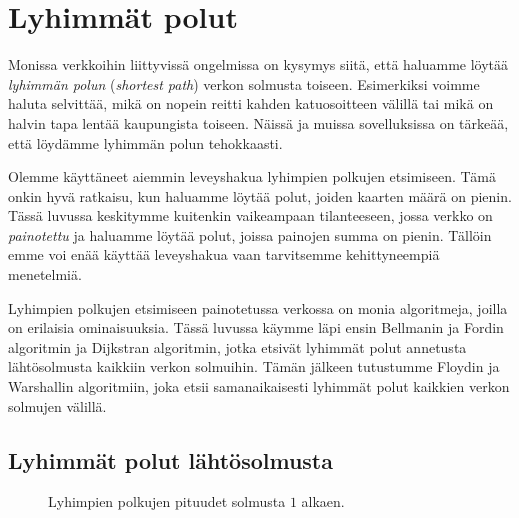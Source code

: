 \chapter{Lyhimmät polut}


Monissa verkkoihin liittyvissä ongelmissa on kysymys siitä,
että haluamme löytää \emph{lyhimmän polun} (\emph{shortest path})
verkon solmusta toiseen.
Esimerkiksi voimme haluta selvittää,
mikä on nopein reitti kahden katuosoitteen välillä
tai mikä on halvin tapa lentää kaupungista toiseen.
Näissä ja muissa sovelluksissa on tärkeää,
että löydämme lyhimmän polun tehokkaasti.

Olemme käyttäneet aiemmin leveyshakua lyhimpien
polkujen etsimiseen.
Tämä onkin hyvä ratkaisu, kun haluamme löytää polut,
joiden kaarten määrä on pienin.
Tässä luvussa keskitymme kuitenkin vaikeampaan
tilanteeseen, jossa verkko on \emph{painotettu}
ja haluamme löytää polut,
joissa painojen summa on pienin.
Tällöin emme voi enää käyttää leveyshakua vaan
tarvitsemme kehittyneempiä menetelmiä.

Lyhimpien polkujen etsimiseen painotetussa verkossa
on monia algoritmeja, joilla on erilaisia ominaisuuksia.
Tässä luvussa käymme läpi ensin Bellmanin ja Fordin algoritmin ja
Dijkstran algoritmin,
jotka etsivät lyhimmät polut annetusta lähtösolmusta
kaikkiin verkon solmuihin.
Tämän jälkeen tutustumme Floydin ja Warshallin algoritmiin,
joka etsii samanaikaisesti lyhimmät polut kaikkien
verkon solmujen välillä.

\section{Lyhimmät polut lähtösolmusta}

\begin{figure}
\center
\begin{center}
\end{center}
\caption{Lyhimpien polkujen pituudet solmusta $1$ alkaen.}
\label{fig:lypola}
\end{figure}

